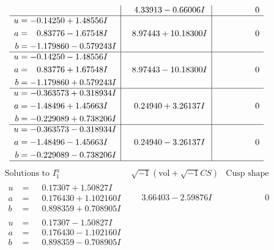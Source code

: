 \documentclass[1p]{elsarticle_modified}
\theoremstyle{definition}
\newcommand{\I}{\sqrt{-1}}
\begin{document}
$$\begin{array}{c|c|c}
 & \phantom{-}4.33913 - 0.66006 I & \phantom{-0.000000 } 0 \\ \hline\begin{aligned}
u &= -0.14250 + 1.48556 I \\
a &= \phantom{-}0.83776 - 1.67548 I \\
b &= -1.179860 - 0.579243 I\end{aligned}
 & \phantom{-}8.97443 + 10.18300 I & \phantom{-0.000000 } 0 \\ \hline\begin{aligned}
u &= -0.14250 - 1.48556 I \\
a &= \phantom{-}0.83776 + 1.67548 I \\
b &= -1.179860 + 0.579243 I\end{aligned}
 & \phantom{-}8.97443 - 10.18300 I & \phantom{-0.000000 } 0 \\ \hline\begin{aligned}
u &= -0.363573 + 0.318934 I \\
a &= -1.48496 + 1.45663 I \\
b &= -0.229089 + 0.738206 I\end{aligned}
 & \phantom{-}0.24940 + 3.26137 I & \phantom{-0.000000 } 0 \\ \hline\begin{aligned}
u &= -0.363573 - 0.318934 I \\
a &= -1.48496 - 1.45663 I \\
b &= -0.229089 - 0.738206 I\end{aligned}
 & \phantom{-}0.24940 - 3.26137 I & \phantom{-0.000000 } 0\\
 \hline 
 \end{array}$$\newpage$$\begin{array}{c|c|c}  
\text{Solutions to }I^u_{1}& \I (\text{vol} + \sqrt{-1}CS) & \text{Cusp shape}\\
 \hline 
\begin{aligned}
u &= \phantom{-}0.17307 + 1.50827 I \\
a &= \phantom{-}0.176430 + 1.102160 I \\
b &= \phantom{-}0.898359 + 0.708905 I\end{aligned}
 & \phantom{-}3.66403 - 2.59876 I & \phantom{-0.000000 } 0 \\ \hline\begin{aligned}
u &= \phantom{-}0.17307 - 1.50827 I \\
a &= \phantom{-}0.176430 - 1.102160 I \\
b &= \phantom{-}0.898359 - 0.708905 I\end{aligned}

\end{array}$$
\end{document}
